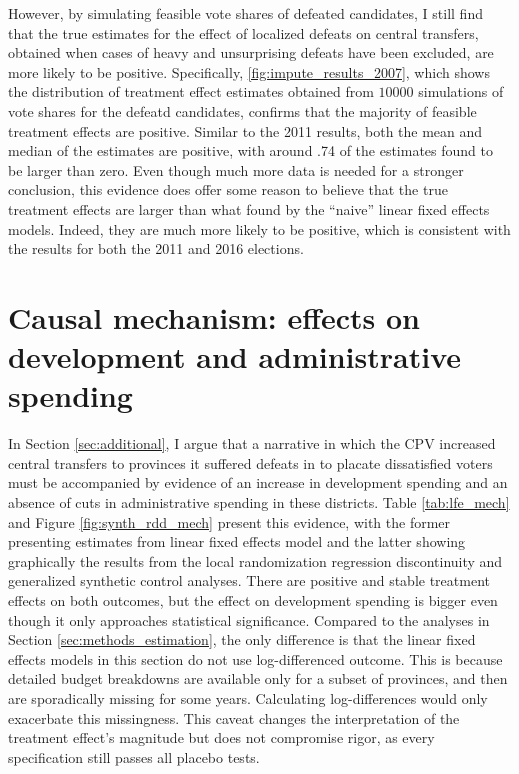 \documentclass[12pt]{article}
\newcommand{\1}{\mathbbm{1}}
\begin{document}
However, by simulating feasible vote shares of defeated candidates, I still find that the true estimates for the effect of localized defeats on central transfers, obtained when cases of heavy and unsurprising defeats have been excluded, are more likely to be positive. Specifically, \autoref{fig:impute_results_2007}, which shows the distribution of treatment effect estimates obtained from $10000$ simulations of vote shares for the defeatd candidates, confirms that the majority of feasible treatment effects are positive. Similar to the 2011 results, both the mean and median of the estimates are positive, with around .74 of the estimates found to be larger than zero. Even though much more data is needed for a stronger conclusion, this evidence does offer some reason to believe that the true treatment effects are larger than what found by the ``naive'' linear fixed effects models. Indeed, they are much more likely to be positive, which is consistent with the results for both the 2011 and 2016 elections.

\clearpage

\section{Causal mechanism: effects on development and administrative spending}
\label{app:mechanisms}

In Section \ref{sec:additional}, I argue that a narrative in which the CPV increased central transfers to provinces it suffered defeats in to placate dissatisfied voters must be accompanied by evidence of an increase in development spending and an absence of cuts in administrative spending in these districts. Table \ref{tab:lfe_mech} and Figure \ref{fig:synth_rdd_mech} present this evidence, with the former presenting estimates from linear fixed effects model and the latter showing graphically the results from the local randomization regression discontinuity and generalized synthetic control analyses. There are positive and stable treatment effects on both outcomes, but the effect on development spending is bigger even though it only approaches statistical significance. Compared to the analyses in Section \ref{sec:methods_estimation}, the only difference is that the linear fixed effects models in this section do not use log-differenced outcome. This is because detailed budget breakdowns are available only for a subset of provinces, and then are sporadically missing for some years. Calculating log-differences would only exacerbate this missingness. This caveat changes the interpretation of the treatment effect's magnitude but does not compromise rigor, as every specification still passes all placebo tests.
\end{document}
